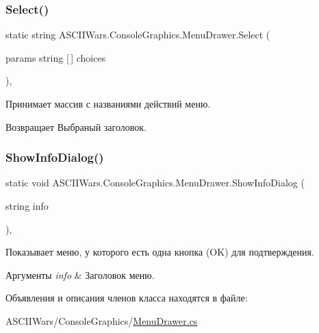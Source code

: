 \subsubsection{\texorpdfstring{Select()}{Select()}\hspace{0.1cm}{\footnotesize\ttfamily [4/4]}}
{\footnotesize\ttfamily static string A\+S\+C\+I\+I\+Wars.\+Console\+Graphics.\+Menu\+Drawer.\+Select (\begin{DoxyParamCaption}\item[{params string \mbox{[}$\,$\mbox{]}}]{choices }\end{DoxyParamCaption})\hspace{0.3cm}{\ttfamily [inline]}, {\ttfamily [static]}}



Принимает массив с названиями действий меню. 

\begin{DoxyReturn}{Возвращает}
Выбраный заголовок. 
\end{DoxyReturn}
\hypertarget{class_a_s_c_i_i_wars_1_1_console_graphics_1_1_menu_drawer_a48cc3b43302cba89239d72c3f6bcddab}{}\label{class_a_s_c_i_i_wars_1_1_console_graphics_1_1_menu_drawer_a48cc3b43302cba89239d72c3f6bcddab} 
\subsubsection{\texorpdfstring{Show\+Info\+Dialog()}{ShowInfoDialog()}}
{\footnotesize\ttfamily static void A\+S\+C\+I\+I\+Wars.\+Console\+Graphics.\+Menu\+Drawer.\+Show\+Info\+Dialog (\begin{DoxyParamCaption}\item[{string}]{info }\end{DoxyParamCaption})\hspace{0.3cm}{\ttfamily [inline]}, {\ttfamily [static]}}



Показывает меню, у которого есть одна кнопка ({\ttfamily OK}) для подтверждения. 


\begin{DoxyParams}{Аргументы}
{\em info} & Заголовок меню. \\
\hline
\end{DoxyParams}


Объявления и описания членов класса находятся в файле\+:\begin{DoxyCompactItemize}
\item 
A\+S\+C\+I\+I\+Wars/\+Console\+Graphics/\hyperlink{_menu_drawer_8cs}{Menu\+Drawer.\+cs}\end{DoxyCompactItemize}
